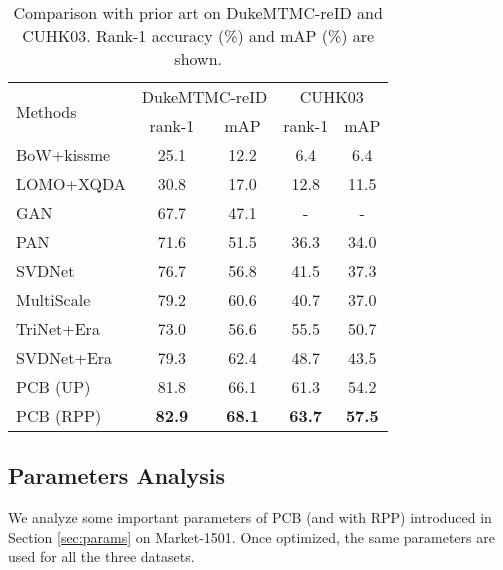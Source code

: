 \documentclass[10pt,twocolumn,letterpaper]{article}
\begin{document}
\setlength{\tabcolsep}{4.6pt}
\begin{table}
\begin{center}
\begin{tabular}{l|cc|cc}
\hline
\multicolumn{1}{l|}{\multirow{2}{*}{Methods}}&\multicolumn{2}{c|}{DukeMTMC-reID}&\multicolumn{2}{c}{CUHK03}\\
\cline{2-5}
\multicolumn{1}{c|}{}&rank-1&mAP&rank-1&mAP\\
\hline
BoW+kissme \cite{DBLP:conf/iccv/ZhengSTWWT15} & 25.1 & 12.2 & 6.4 & 6.4\\
LOMO+XQDA \cite{DBLP:conf/cvpr/LiaoHZL15} & 30.8 & 17.0 & 12.8 & 11.5 \\
GAN \cite{zheng2017unlabeled} & {67.7}  & {47.1} & - & - \\
PAN \cite{Zheng2017PAN} & 71.6& 51.5 & 36.3 &34.0\\
SVDNet \cite{Sun2017SVDNet} &76.7&56.8&41.5&37.3\\
MultiScale \cite{ChenPerson_multiscale}   &79.2&60.6&40.7&37.0\\
TriNet+Era \cite{Zhong2017Random} &73.0&56.6&55.5&50.7\\
SVDNet+Era \cite{Zhong2017Random} &79.3&62.4&48.7&43.5\\
\hline
PCB (UP) &81.8&66.1 &61.3 & 54.2 \\
PCB (RPP)&\textbf{82.9}& \textbf{68.1} & \textbf{63.7} & \textbf{57.5} \\


\hline
\end{tabular}
\end{center}
\setlength{\abovecaptionskip}{0cm} 
\setlength{\belowcaptionskip}{0pt} 
\caption{Comparison with prior art on DukeMTMC-reID and CUHK03. Rank-1 accuracy (\%) and mAP (\%) are shown. }
\label{table:duke}
\end{table}




\subsection{Parameters Analysis}\label{sec:cmp_params}
We analyze some important parameters of PCB (and with RPP) introduced in Section \ref{sec:params} on Market-1501. Once optimized, the same parameters are used for all the three datasets. 
\end{document}
